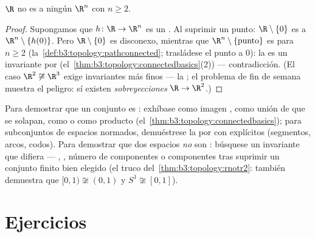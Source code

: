 \begin{theorem}\label{thm:b3:topology:rnotr2}
$\R$ no es  a ningún
$\R^n$ con $n \geq 2$.
\end{theorem}

\begin{proof}
Supongamos que $h \colon \R \to \R^n$ es un
. Al suprimir un
punto: $\R \setminus \{0\}$ es
 a $\R^n \setminus
\{h(0)\}$. Pero $\R\setminus\{0\}$ es disconexo, mientras que
$\R^n\setminus\{\text{punto}\}$ es
 para $n \geq
2$ (la~\cref{def:b3:topology:pathconnected}; trasládese el punto a $0$):
la  es un invariante por
(el~\cref{thm:b3:topology:connectedbasics}(2)) --- contradicción. (El
caso $\R^2 \not\cong \R^3$ exige invariantes más finos --- la
; el problema de fin de
semana muestra el peligro: sí existen \emph{sobreyecciones
} $\R \to \R^2$.)
\end{proof}

\begin{method}\label{met:b3:topology:connectargument}
Para demostrar que un conjunto es
: exhíbase como imagen
, como unión de
 que se solapan, como
 o como producto
(el~\cref{thm:b3:topology:connectedbasics}); para subconjuntos de
espacios normados, demuéstrese la
 por  con
 explícitos (segmentos,
arcos, codos). Para demostrar que dos espacios \emph{no} son
: búsquese un invariante
 que difiera ---
, , número de
componentes o componentes tras suprimir un conjunto finito bien elegido
(el truco del~\cref{thm:b3:topology:rnotr2}: también demuestra que
$[0,1) \not\cong
(0,1)$ y $S^1 \not\cong [0,1]$).
\end{method}

\section{Ejercicios}

